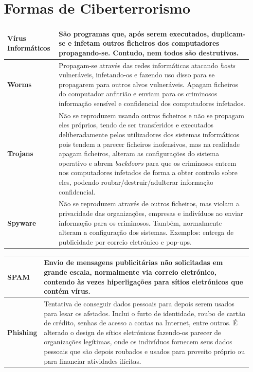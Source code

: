\documentclass{report}
\begin{document}
\chapter{Formas de Ciberterrorismo}
\label{chap.Formas de Ciberterrorismo}
\begin{tabular}{ | p{3.5cm} |p{8cm}| }
\hline
\center
\textbf{Vírus Informáticos} & São programas que, após serem executados, duplicam-se e infetam outros ficheiros dos computadores propagando-se. Contudo, nem todos são destrutivos. \\ \hline
\center
\textbf{Worms} & Propagam-se através das redes informáticas atacando \textit{hosts} vulneráveis, infetando-os e fazendo uso disso para se propagarem para outros alvos vulneráveis. Apagam ficheiros do computador anfitrião e enviam para os criminosos informação sensível e confidencial dos computadores infetados. \\ \hline
\center
\textbf{Trojans} & Não se reproduzem usando outros ficheiros e não se propagam eles próprios, tendo de ser transferidos e executados deliberadamente pelos utilizadores dos sistemas informáticos pois tendem a parecer ficheiros inofensivos, mas na realidade apagam ficheiros, alteram as configurações do sistema operativo e abrem \textit{backdoors} para que os criminosos entrem nos computadores infetados de forma a obter controlo sobre eles, podendo roubar/destruir/adulterar informação confidencial. \\ \hline
\center
\textbf{Spyware} & Não se reproduzem através de outros ficheiros, mas violam a privacidade das organizações, empresas e indivíduos ao enviar informação para os criminosos. Também, normalmente alteram a configuração dos sistemas. Exemplos: entrega de publicidade por correio eletrónico e pop-ups.\\ \hline
\end{tabular}

\begin{tabular}{ | p{3.5cm} |p{8cm}| }
\hline
\center
\textbf{SPAM} & Envio de mensagens publicitárias não solicitadas em grande escala, normalmente via correio eletrónico, contendo às vezes hiperligações para sítios eletrónicos que contém vírus.\\ \hline
\center
\textbf{Phishing} & Tentativa de conseguir dados pessoais para depois serem usados para lesar os afetados. Inclui o furto de identidade, roubo de cartão de crédito, senhas de acesso a contas na Internet, entre outros. É alterado o design de sítios eletrónicos fazendo-os parecer de organizações legítimas, onde os indivíduos fornecem seus dados pessoais que são depois roubados e usados para proveito próprio ou para financiar atividades ilícitas.\\ \hline
\end{tabular}
\end{document}

